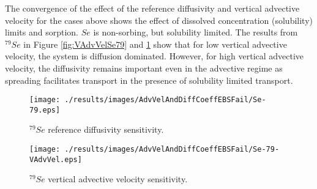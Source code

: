 The convergence of the effect of the reference diffusivity and vertical
advective velocity for the cases above shows the effect of dissolved
concentration (solubility) limits and sorption. $Se$ is non-sorbing, but
solubility limited.  The results from $^{79}Se$ in Figure \ref{fig:VAdvVelSe79}
and \ref{fig:VAdvVelSe79VAdvVel} show that for low vertical advective velocity,
the system is diffusion dominated.  However, for high vertical advective
velocity, the diffusivity remains important even in the advective regime as
spreading facilitates transport in the presence of solubility limited transport.

\begin{figure}[htp!]
\begin{minipage}[b]{0.45\linewidth}
\centering
\texttt{[image: ./results/images/AdvVelAndDiffCoeffEBSFail/Se-79.eps]}
\caption{$^{79}Se$ reference diffusivity sensitivity.}
\label{fig:VAdvVelSe79}

\end{minipage}
\hspace{0.05\linewidth}
\begin{minipage}[b]{0.45\linewidth}

\texttt{[image: ./results/images/AdvVelAndDiffCoeffEBSFail/Se-79-VAdvVel.eps]}
\caption{$^{79}Se$ vertical advective velocity sensitivity.}
\label{fig:VAdvVelSe79VAdvVel}

\end{minipage}
\end{figure}
\FloatBarrier
